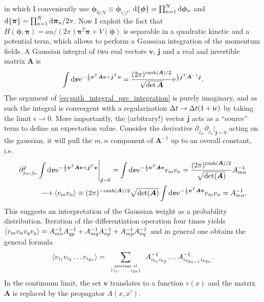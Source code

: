 in which I conveniently use $\bm\phi_{0/N}\equiv \bm\phi_{i/f}$, $\mathrm d\{\bm\phi\}=\prod_{n=1}^N\mathrm d\bm\phi_n$ and $\mathrm d\{\bm\pi\}=\prod_{n=1}^N\mathrm d\bm\pi_n/2\pi$.
Now I exploit the fact that $H(\bm\phi,\bm\pi)=au/(2\pi)\bm\pi^T\bm\pi + V(\bm\phi)$ is separable in a quadratic kinetic and a potential term, which allows to perform a Gaussian integration of the momentum fields.
A Gaussian integral of two real vectors $\bm v$, $\bm j$ and a real and invertible matrix $\bm A$ is
\begin{align}
    \int\mathrm d\bm v\mathrm e^{-\frac12\bm v^T\bm A\bm v + \bm j^T\bm v} = \frac{(2\pi)^{{\rm rank}(\bm A)/2}}{\sqrt{\det\bm A}}\mathrm e^{\frac12\bm j^T\bm A^{-1}\bm j}.
    \label{eq:multi_gaussian}
\end{align}
The argument of \cref{eq:path_integral_pre_integration} is purely imaginary, and as such the integral is convergent with a regularization $\Delta t\rightarrow\Delta t(1+\mathrm i\epsilon)$ by taking the limit $\epsilon\rightarrow0$.
More importantly, the (arbitrary!) vector $\bm j$ acts as a ``source'' term to define an expectation value.
Consider the derivative $\partial_{j_m}\partial_{j_n}|_{\bm j=0}$ acting on the gaussian, it will pull the $m,n$ component of $\bm A^{-1}$ up to an overall constant, i.e.
\begin{align}
    \partial^2_{j_m,j_n}\int\mathrm d\bm v\mathrm e^{-\frac12\bm v^T\bm A\bm v + \bm j^T \bm v}\Bigg|_{\bm j=0}
    =
    \int\mathrm d\bm v\mathrm e^{-\frac12\bm v^T\bm A\bm v}v_mv_n
    =
    \frac{(2\pi)^{{\rm rank}(\bm A)/2}}{\sqrt{\det(\bm A)}}A^{-1}_{mn}
    \\
    \longrightarrow \braket{v_mv_n}\equiv (2\pi)^{-{\rm rank}(\bm A)/2}\sqrt{\det(\bm A)}\int\mathrm d\bm v\mathrm e^{-\frac12\bm v^T\bm A\bm v}v_mv_n = A_{mn}^{-1}.
    \label{eq:multi_source}
\end{align}
This suggests an interpretation of the Gaussian weight as a probability distribution.
Iteration of the differentiation operation four times yields $\braket{v_mv_nv_qv_p}=A^{-1}_{mn}A^{-1}_{qp}+A^{-1}_{mq}A^{-1}_{np}+A^{-1}_{mp}A^{-1}_{nq}$ and in general one obtains the general formula
\begin{align}
    \braket{v_{i_1}v_{i_2}\dots v_{i_{2n}}} =
    \sum_{\tiny\begin{array}{c}\text{pairings of}\\ \{i_1,\dots,i_{2n}\}\end{array}}
    A^{-1}_{i_{k_1}i_{k_2}}\dots A^{-1}_{i_{k_{2n-1}}i_{k_{2n}}}.
\end{align}
In the continuum limit, the set $\bm v$ translates to a function $v(x)$ and the matrix $\bm A$ is replaced by the propagator $A(x,x')$.
